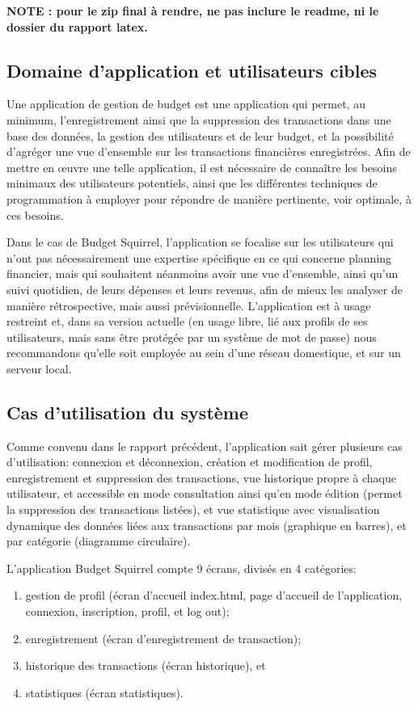 \documentclass[a4paper,12pt]{article}
\begin{document}
\textbf{NOTE : pour le zip final à rendre, ne pas inclure le readme, ni le dossier du rapport latex.}

\subsection{Domaine d'application et utilisateurs cibles}

Une application de gestion de budget est une application qui permet, au minimum, l'enregistrement ainsi que la suppression des transactions dans une base des données, la gestion des utilisateurs et de leur budget, et la possibilité d'agréger une vue d'ensemble sur les transactions financières enregistrées.
Afin de mettre en œuvre une telle application, il est nécessaire de connaître les besoins minimaux des utilisateurs potentiels, ainsi que les différentes techniques de programmation à employer pour répondre de manière pertinente, voir optimale, à ces besoins.

Dans le cas de Budget Squirrel, l'application se focalise sur les utilisateurs qui n’ont pas nécessairement une expertise spécifique en ce qui concerne planning financier, mais qui souhaitent néanmoins avoir une vue d’ensemble, ainsi qu’un suivi quotidien, de leurs dépenses et leurs revenus, afin de mieux les analyser de manière rétrospective, mais aussi prévisionnelle.
L'application est à usage restreint et, dans sa version actuelle (en usage libre, lié aux profils de ses utilisateurs, mais sans être protégée par un système de mot de passe) nous recommandons qu'elle soit employée au sein d'une réseau domestique, et sur un serveur local.

\subsection{Cas d'utilisation du système}

Comme convenu dans le rapport précédent, l'application sait gérer plusieurs cas d'utilisation: connexion et déconnexion, création et modification de profil, enregistrement et suppression des transactions, vue historique propre à chaque utilisateur, et accessible en mode consultation ainsi qu'en mode édition (permet la suppression des transactions listées), et vue statistique avec visualisation dynamique des données liées aux transactions par mois (graphique en barres), et par catégorie (diagramme circulaire).

L'application Budget Squirrel compte 9 écrans, divisés en 4 catégories:
\begin{enumerate}
\item gestion de profil (écran d’accueil index.html, page d'accueil de l'application, connexion, inscription, profil, et log out);
\item enregistrement (écran d'enregistrement de transaction);
\item historique des transactions (écran historique), et 
\item statistiques (écran statistiques).
\end{enumerate}
\end{document}
